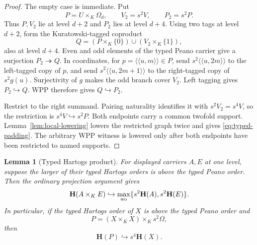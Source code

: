 \documentclass[11pt]{article}
\newtheorem{lemma}[theorem]{Lemma}
\numberwithin{equation}{section}
\theoremstyle{definition}
\theoremstyle{remark}
\newcommand{\inj}{\hookrightarrow}
\newcommand{\surj}{\twoheadrightarrow}
\begin{document}
\begin{proof}
The empty case is immediate.  Put
\[
 P=U\times_K\Omega_d,\qquad V_2=s^2V,\qquad P_2=s^2P.
\]
Thus $P,V_2$ lie at level $d+2$ and $P_2$ lies at level $d+4$.
Using two tags at level $d+2$, form the Kuratowski-tagged coproduct
\[
Q=(P\times_K\{0\})\cup(V_2\times_K\{1\}),
\]
also at level $d+4$.  Even and odd elements of the typed Peano carrier
give a surjection $P_2\surj Q$.  In coordinates, for
$p=\langle\!\langle u,m\rangle\!\rangle\in P$, send
$s^2\langle\!\langle u,2m\rangle\!\rangle$ to the left-tagged copy of
$p$, and send
$s^2\langle\!\langle u,2m+1\rangle\!\rangle$ to the right-tagged copy of
$s^2g(u)$.  Surjectivity of $g$ makes the odd branch cover $V_2$.
Left tagging gives $P_2\inj Q$.  WPP therefore gives $Q\inj P_2$.

Restrict to the right summand.  Pairing naturality identifies it with
$s^2V_2=s^4V$, so the restriction is $s^4V\inj s^2P$.  Both endpoints
carry a common twofold support.  Lemma~\ref{lem:local-lowering} lowers the
restricted graph twice and gives \eqref{eq:typed-padding}.  The arbitrary
WPP witness is lowered only after both endpoints have been restricted to
named supports.
\end{proof}

\begin{lemma}[Typed Hartogs product]
\label{lem:typed-hartogs-product}
For displayed carriers $A,E$ at one level, suppose the larger of their
typed Hartogs orders is above the typed Peano order.  Then the ordinary
projection argument gives
\begin{equation}
 \mathbf H(A\times_KE)
 \inj
 \max_{\rm wo}\{s^2\mathbf H(A),s^2\mathbf H(E)\}.
 \label{eq:typed-hartogs-product}
\end{equation}
In particular, if the typed Hartogs order of $X$ is above the typed Peano
order and
\[
 P=(X\times_KX)\times_Ks^2\Omega,
\]
then
\begin{equation}
 \mathbf H(P)\inj s^4\mathbf H(X).
 \label{eq:typed-hartogs-special}
\end{equation}
\end{lemma}
\end{document}
